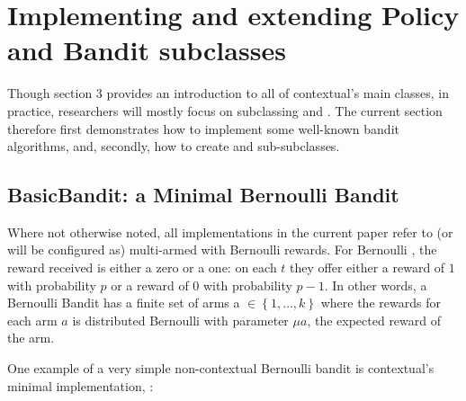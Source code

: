 \documentclass[nojss]{jss}\usepackage[]{graphicx}\usepackage[]{color}
\begin{document}
\section{Implementing and extending Policy and Bandit subclasses}

Though section 3 provides an introduction to all of contextual's main classes, in practice, researchers will mostly focus on subclassing  and . The current section therefore first demonstrates how to implement some well-known bandit algorithms, and, secondly, how to create  and  sub-subclasses.

\subsection{BasicBandit: a Minimal Bernoulli Bandit}

Where not otherwise noted, all  implementations in the current paper refer to (or will be configured as) multi-armed  with Bernoulli rewards. For Bernoulli , the reward received is either a zero or a one: on each $t$ they offer either a reward of $1$ with probability $p$ or a reward of $0$ with probability $p - 1$. In other words, a Bernoulli Bandit has a finite set of arms a \(  \in \left\{ 1, \dots, k \right\} \) where the rewards for each arm $a$ is distributed Bernoulli with parameter ${\mu}a$, the expected reward of the arm.

One example of a very simple non-contextual Bernoulli bandit is contextual's minimal  implementation, :
\end{document}
